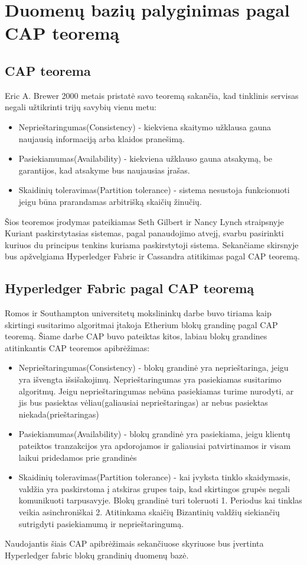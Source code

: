 \documentclass{VUMIFPSkursinis}
\begin{document}
\section{Duomenų bazių palyginimas pagal CAP teoremą}
	\subsection{CAP teorema}
		Eric A. Brewer 2000 \cite{CAP} metais pristatė savo teoremą sakančia, kad tinklinis servisas negali užtikrinti trijų savybių vienu metu:
		\begin{itemize}
			\item{Neprieštaringumas(Consistency) - kiekviena skaitymo užklausa gauna naujausią informaciją arba klaidos pranešimą.}
			\item{Pasiekiamumas(Availability) - kiekviena užklauso gauna atsakymą, be garantijos, kad atsakyme bus naujausias įrašas. }
			\item{Skaidinių toleravimas(Partition tolerance) - sistema nesustoja funkcionuoti jeigu būna prarandamas arbitrišką skaičių žinučių.}
		\end{itemize}
		Šios teoremos įrodymas pateikiamas Seth Gilbert ir Nancy Lynch straipsnyje \cite{CAPP}
		\linebreak
		Kuriant paskirstytasias sistemas, pagal panaudojimo atvejį, svarbu pasirinkti kuriuos du principus tenkins kuriama paskirstytoji sistema.
		Sekančiame skirsnyje bus apžvelgiama Hyperledger Fabric ir Cassandra atitikimas pagal CAP teoremą.
	\subsection{Hyperledger Fabric pagal CAP teoremą}
		Romos ir Southampton universitetų mokslininkų darbe \cite{BCCAP} buvo tiriama kaip skirtingi susitarimo algoritmai įtakoja Etherium blokų grandinę
		pagal CAP teoremą. Šiame darbe CAP buvo pateiktas kitos, labiau blokų grandines atitinkantis CAP teoremos apibrėžimas:
	
		\begin{itemize}
			\item{Neprieštaringumas(Consistency) - blokų grandinė yra neprieštaringa, jeigu yra išvengta išsišakojimų. Neprieštaringumas yra pasiekiamas 
					susitarimo algoritmų. Jeigu neprieštaringumas nebūna pasiekiamas turime nurodyti, ar jis bus pasiektas vėliau(galiausiai neprieštaringas) ar nebus pasiektas niekada(prieštaringas) }
			\item{Pasiekiamumas(Availability) - blokų grandinė yra pasiekiama, jeigu klientų pateiktos tranzakcijos yra apdorojamos ir galiausiai patvirtinamos ir visam laikui pridedamos prie grandinės}
			\item{Skaidinių toleravimas(Partition tolerance) - kai įvyksta tinklo skaidymasis, valdžia yra paskirstoma į atskiras grupes taip, kad skirtingos grupės negali komunikuoti tarpusavyje. Blokų grandinė turi toleruoti 1. Periodus kai tinklas veikia asinchroniškai 2. Atitinkama skaičių Bizantinių valdžių siekiančių sutrigdyti pasiekiamumą ir neprieštaringumą.}
		\end{itemize}
		Naudojantis šiais CAP apibrėžimais sekančiuose skyriuose bus įvertinta Hyperledger fabric blokų grandinių duomenų bazė.
\end{document}
